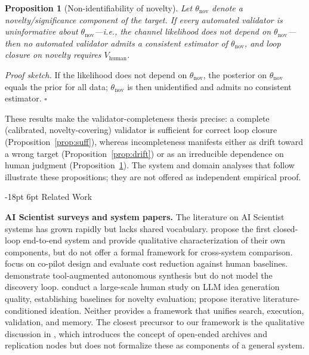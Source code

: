 \documentclass[11pt]{article}
\makeatletter
\newtheorem{proposition}{Proposition}
\renewcommand\section{\@startsection{section}{1}{\z@}%
  {-18pt \@plus -4pt \@minus -2pt}%
  {6pt \@plus 2pt}%
  {\normalfont\large\bfseries}}
\makeatother
\begin{document}
\begin{proposition}[Non-identifiability of novelty]
\label{prop:novelty}
Let $\theta_{\mathrm{nov}}$ denote a novelty/significance component of the target. If every automated validator is uninformative about $\theta_{\mathrm{nov}}$---i.e., the channel likelihood does not depend on $\theta_{\mathrm{nov}}$---then no automated validator admits a consistent estimator of $\theta_{\mathrm{nov}}$, and loop closure on novelty requires $V_{\mathrm{human}}$.
\end{proposition}

\noindent\emph{Proof sketch.} If the likelihood does not depend on $\theta_{\mathrm{nov}}$, the posterior on $\theta_{\mathrm{nov}}$ equals the prior for all data; $\theta_{\mathrm{nov}}$ is then unidentified and admits no consistent estimator. $\square$

These results make the validator-completeness thesis precise: a complete (calibrated, novelty-covering) validator is sufficient for correct loop closure (Proposition~\ref{prop:suff}), whereas incompleteness manifests either as drift toward a wrong target (Proposition~\ref{prop:drift}) or as an irreducible dependence on human judgment (Proposition~\ref{prop:novelty}). The system and domain analyses that follow illustrate these propositions; they are not offered as independent empirical proof.

\section{Related Work}
\label{sec:related}

\textbf{AI Scientist surveys and system papers.} The literature on AI Scientist systems has grown rapidly but lacks shared vocabulary. \citet{lu2024aiscientist} propose the first closed-loop end-to-end system and provide qualitative characterization of their own components, but do not offer a formal framework for cross-system comparison. \citet{schmidgall2025agentlab} focus on co-pilot design and evaluate cost reduction against human baselines. \citet{boiko2023emergent} demonstrate tool-augmented autonomous synthesis but do not model the discovery loop. \citet{si2024novelideas} conduct a large-scale human study on LLM idea generation quality, establishing baselines for novelty evaluation; \citet{baek2024researchagent} propose iterative literature-conditioned ideation. Neither provides a framework that unifies search, execution, validation, and memory. The closest precursor to our framework is the qualitative discussion in \citet{lu2026aiscientist}, which introduces the concept of open-ended archives and replication nodes but does not formalize these as components of a general system.
\end{document}
